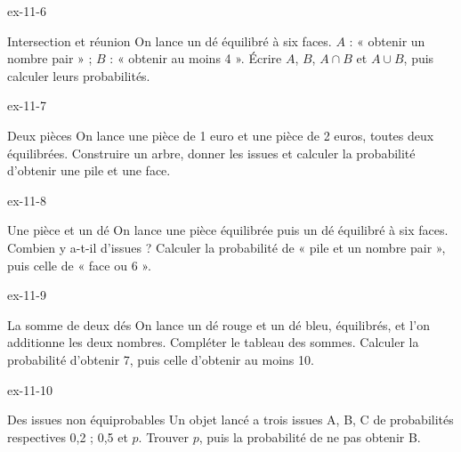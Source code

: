 \begin{blocLivre}{ex-11-6}\begin{exercice}[2]{Intersection et réunion}
On lance un dé équilibré à six faces. $A$ : « obtenir un nombre pair » ; $B$ : « obtenir au moins 4 ». Écrire $A$, $B$, $A\cap B$ et $A\cup B$, puis calculer leurs probabilités.
\label{fig-ex-11-6}
\end{exercice}\end{blocLivre}
\begin{blocLivre}{ex-11-7}\begin{exercice}[2]{Deux pièces}
On lance une pièce de 1 euro et une pièce de 2 euros, toutes deux équilibrées. Construire un arbre, donner les issues et calculer la probabilité d’obtenir une pile et une face.
\label{fig-ex-11-7}
\end{exercice}\end{blocLivre}
\begin{blocLivre}{ex-11-8}\begin{exercice}[2]{Une pièce et un dé}
On lance une pièce équilibrée puis un dé équilibré à six faces. Combien y a-t-il d’issues ? Calculer la probabilité de « pile et un nombre pair », puis celle de « face ou 6 ».
\label{fig-ex-11-8}
\end{exercice}\end{blocLivre}
\begin{blocLivre}{ex-11-9}\begin{exercice}[2]{La somme de deux dés}
On lance un dé rouge et un dé bleu, équilibrés, et l’on additionne les deux nombres. Compléter le tableau des sommes. Calculer la probabilité d’obtenir 7, puis celle d’obtenir au moins 10.
\label{fig-ex-11-9}
\end{exercice}\end{blocLivre}
\begin{blocLivre}{ex-11-10}\begin{exercice}[2]{Des issues non équiprobables}
Un objet lancé a trois issues A, B, C de probabilités respectives 0,2 ; 0,5 et $p$. Trouver $p$, puis la probabilité de ne pas obtenir B.
\end{exercice}\end{blocLivre}

